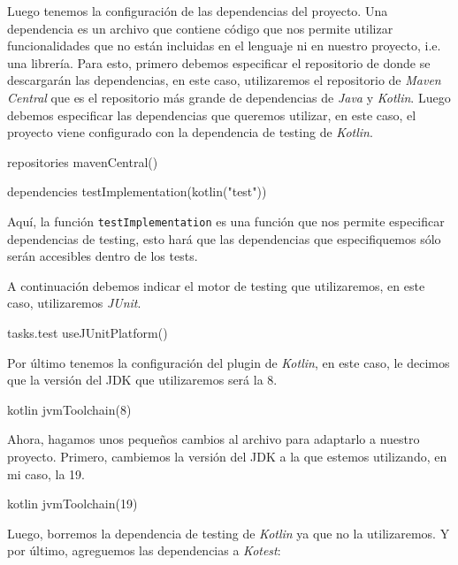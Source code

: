   Luego tenemos la configuración de las dependencias del proyecto.
  Una dependencia es un archivo que contiene código que nos permite utilizar funcionalidades
  que no están incluidas en el lenguaje ni en nuestro proyecto, i.e. una librería.
  Para esto, primero debemos especificar el repositorio de donde se descargarán las dependencias,
  en este caso, utilizaremos el repositorio de \textit{Maven 
  Central}\autocite{MavenCentralRepository} que es el repositorio más grande de dependencias
  de \textit{Java} y \textit{Kotlin}.
  Luego debemos especificar las dependencias que queremos utilizar, en este caso, el proyecto
  viene configurado con la dependencia de testing de \textit{Kotlin}.

  \begin{kotlin}
    repositories {
        mavenCentral()
    }

    dependencies {
        testImplementation(kotlin("test"))
    }
  \end{kotlin}

  Aquí, la función \texttt{testImplementation} es una función que nos permite especificar
  dependencias de testing, esto hará que las dependencias que especifiquemos sólo serán accesibles
  dentro de los tests.

  A continuación debemos indicar el motor de testing que utilizaremos, en este caso, utilizaremos
  \textit{JUnit}.

  \begin{kotlin}
    tasks.test {
        useJUnitPlatform()
    }
  \end{kotlin}

  Por último tenemos la configuración del plugin de \textit{Kotlin}, en este caso, le decimos que
  la versión del JDK que utilizaremos será la 8.

  \begin{kotlin}
    kotlin {
        jvmToolchain(8)
    }
  \end{kotlin}

  Ahora, hagamos unos pequeños cambios al archivo para adaptarlo a nuestro proyecto.
  Primero, cambiemos la versión del JDK a la que estemos utilizando, en mi caso, la 19.

  \begin{kotlin}
    kotlin {
        jvmToolchain(19)
    }
  \end{kotlin}

  Luego, borremos la dependencia de testing de \textit{Kotlin} ya que no la utilizaremos.
  Y por último, agreguemos las dependencias a \textit{Kotest}:

